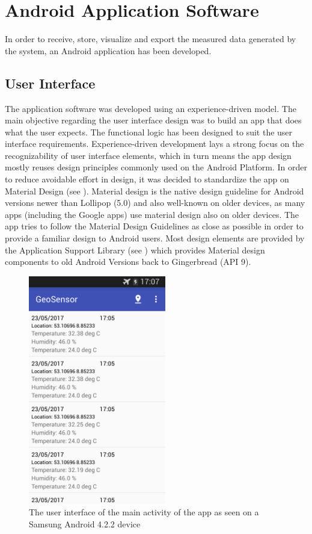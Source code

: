 \chapter{Android Application Software}
In order to receive, store, visualize and export the measured data generated by the system, an Android application has been developed.

\section{User Interface}
The application software was developed using an experience-driven model. The main objective regarding the user interface design was to build an app that does what the user expects. The functional logic has been designed to suit the user interface requirements. Experience-driven development lays a strong focus on the recognizability of user interface elements, which in turn means the app design mostly reuses design principles commonly used on the Android Platform. In order to reduce avoidable effort in design, it was decided to standardize the app on Material Design (see \cite{Material}). Material design is the native design guideline for Android versions newer than Lollipop (5.0) and also well-known on older devices, as many apps (including the Google apps) use material design also on older devices. The app tries to follow the Material Design Guidelines as close as possible in order to provide a familiar design to Android users. Most design elements are provided by the Application Support Library (see \cite{AppCompat}) which provides Material design components to old Android Versions back to Gingerbread (API 9).

\begin{figure}[ht]
	\centering
	\includegraphics[width=6cm]{src/main_list}
	\caption[Main List]
	{The user interface of the main activity of the app as seen on a Samsung Android 4.2.2 device}
\end{figure}

